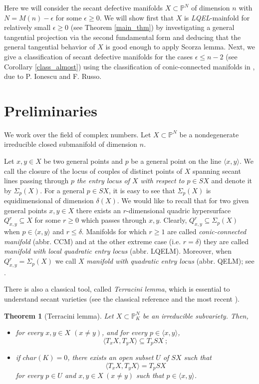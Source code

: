 \documentclass[11pt]{amsart}
\def\P{{\mathbb P}}
\theoremstyle{theorem} %
\newtheorem{Thm}{Theorem}[section]
\theoremstyle{definition}
\numberwithin{equation}{section}
\begin{document}
Here we will consider the secant defective manifolds $X\subset\P^N$ of dimension $n$ with $N=M(n)-\epsilon$ for some $\epsilon\ge0$. We will show first that $X$ is \textit{LQEL}-mainfold for relatively small $\epsilon\ge 0$ (see Theorem \ref{main_thm}) by investigating a general tangential projection via the second fundamental form and deducing that the general tangential behavior of $X$ is good enough to apply Scorza lemma. Next, we give a classification of secant defective manifolds for the cases $\epsilon\le n-2$ (see Corollary \ref{class_almost}) using the classification of conic-connected manifolds in \cite{IR1}, due to P. Ionescu and F. Russo.
\bigskip






\section{Preliminaries}\label{section_1}

We work over the field of complex numbers. Let $X\subset \P^N$ be a nondegenerate irreducible closed submanifold of dimension $n$. 

Let $x,y\in X$ be two general points and $p$ be a general point on the line $\langle x,y\rangle$. We call the closure of the locus of couples of distinct points of $X$ spanning secant lines passing through $p$ \textit{the entry locus of $X$ with respect to $p\in SX$} and denote it by $\Sigma_p(X)$. For a general $p\in SX$, it is easy to see that $\Sigma_p(X)$ is equidimensional of dimension $\delta(X)$. We would like to recall that for two given general points $x,y\in X$ there exists an $r$-dimensional quadric hypersurface $Q_{x,y}^r\subseteq X$ for some $r\ge0$ which passes through $x,y$. Clearly, $Q_{x,y}^r\subseteq\Sigma_p(X)$ when $p\in\langle x,y\rangle$ and $r\le \delta$. Manifolds for which $r\ge1$ are called \textit{conic-connected manifold} (abbr. CCM) and at the other extreme case (i.e. $r=\delta$) they are called \textit{manifold with local quadratic entry locus} (abbr. LQELM). Moreover, when $Q_{x,y}^r=\Sigma_p(X)$ we call $X$ \textit{manifold with quadratic entry locus} (abbr. QELM); see \cite{Ru1, IR1}.

There is also a classical tool, called \textit{Terracini lemma}, which is essential to understand secant varieties (see the classical reference \cite{Ter} and the most recent \cite{Ad}).

\begin{Thm}[Terracini lemma]\label{terracini}
Let $X\subset\P^N_{K}$ be an irreducible subvariety. Then,
\begin{itemize}
\item[(1)] for every $x,y\in X$ $(x\neq y)$, and for every $p\in\langle x,y\rangle$,
$$\langle T_xX,T_yX\rangle \subseteq T_p SX ~;$$
\item[(2)] if $char(K)=0$, there exists an open subset $U$ of $SX$ such that
$$\langle T_xX,T_yX\rangle = T_p SX $$
for every $p\in U$ and $x,y\in X ~(x\neq y)$ such that $p\in \langle x,y\rangle$.
\end{itemize}
\end{Thm}
\end{document}
